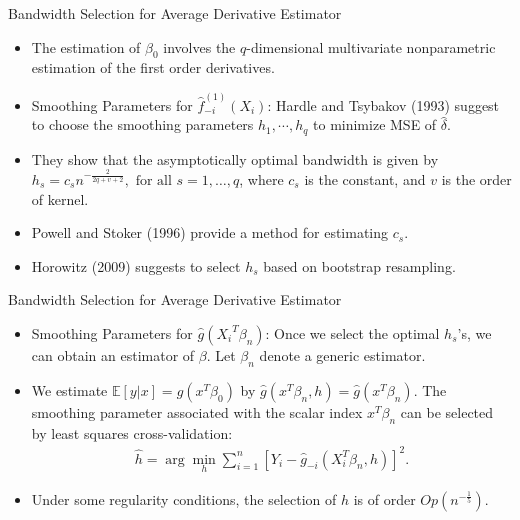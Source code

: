 \documentclass[xcolor=svgnames,dvipdfmx,cjk]{beamer}
\theoremstyle{example}
\def\E{\mathbb{E}}
\begin{document}
\begin{frame}{Bandwidth Selection for Average Derivative Estimator}
\begin{itemize}
  \item The estimation of $\beta_0$ involves 
        the $q$-dimensional multivariate nonparametric estimation of the first order derivatives.
  \item \alert{Smoothing Parameters for $\hat{f}_{-i}^{(1)}(X_i)$}: 
        Hardle and Tsybakov (1993) suggest 
        to choose the smoothing parameters $h_1, \cdots, h_q$ 
        to minimize MSE of $\hat{\delta}$.
  \item They show that the asymptotically optimal bandwidth is given by 
        $h_s = c_s n^{-\frac{2}{2q+v+2}}, \text{ for all } s = 1, \dots, q$, 
        where $c_s$ is the constant, and $v$ is the order of kernel.
  \item Powell and Stoker (1996) provide a method for estimating $c_s$.
  \item Horowitz (2009) suggests to select $h_s$ based on bootstrap resampling.
\end{itemize}
\end{frame}

\begin{frame}{Bandwidth Selection for Average Derivative Estimator}
\begin{itemize}
  \item \alert{Smoothing Parameters for $\hat{g}({X_i}^T\beta_n)$}: 
        Once we select the optimal $h_s$'s, we can obtain an estimator of $\beta$.
        Let $\beta_n$ denote a generic estimator.
  \item We estimate $\E[y|x] = g(x^T\beta_0)$ by $\hat{g}(x^T\beta_n, h) = \hat{g}(x^T\beta_n)$.
        The smoothing parameter associated with the scalar index $x^T \beta_n$ can be selected by least squares cross-validation:
        \begin{align*}
          \hat{h} = \arg\min_{h} \sum_{i=1}^{n} [Y_i - \hat{g}_{-i}(X_i^T\beta_n, h)]^2.
        \end{align*}
  \item Under some regularity conditions, the selection of $h$ is of order $Op(n^{-\frac{1}{5}})$.
\end{itemize}
\end{frame}

 
  
\end{document}
